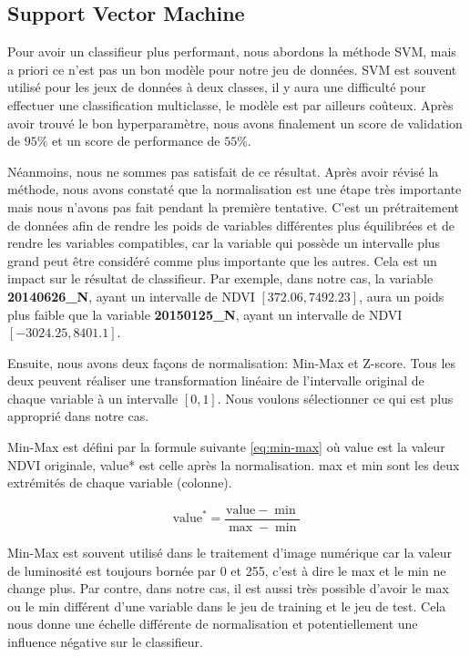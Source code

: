 \documentclass[twocolumn,10pt]{article}
\begin{document}
\subsection{Support Vector Machine} 

Pour avoir un classifieur plus performant, nous abordons la méthode SVM, mais a priori ce n'est pas un bon modèle pour notre jeu de données. SVM est souvent utilisé pour les jeux de données à deux classes, il y aura une difficulté pour effectuer une classification multiclasse, le modèle est par ailleurs coûteux. Après avoir trouvé le bon hyperparamètre, nous avons finalement un score de validation de $ 95\% $ et un score de performance de $ 55\% $.

Néanmoins, nous ne sommes pas satisfait de ce résultat. Après avoir révisé la méthode, nous avons constaté que la normalisation est une étape très importante mais nous n'avons pas fait pendant la première tentative. C'est un prétraitement de données afin de rendre les poids de variables différentes plus équilibrées et de rendre les variables compatibles, car la variable qui possède un intervalle plus grand peut être considéré comme plus importante que les autres. Cela est un impact sur le résultat de classifieur. Par exemple, dans notre cas, la variable \textbf{20140626\_N}, ayant un intervalle de NDVI  \(\left[372.06,7492.23\right]\), aura un poids plus faible que la variable \textbf{20150125\_N}, ayant un intervalle de NDVI \(\left[-3024.25, 8401.1\right]\).

Ensuite, nous avons deux façons de normalisation: Min-Max et Z-score. Tous les deux peuvent réaliser une transformation linéaire de l'intervalle original de chaque variable à un intervalle \(\left[0,1\right]\). Nous voulons sélectionner ce qui est plus approprié dans notre cas.

Min-Max est défini par la formule suivante \ref{eq:min-max} où value est la valeur NDVI originale, value* est celle après la normalisation. max et min sont les deux extrémités de chaque variable (colonne).

\begin{equation}
\label{eq:min-max}
\text{value}^* = \frac{\text{value} - \min}{\max - \min}
\end{equation}

Min-Max est souvent utilisé dans le traitement d'image numérique car la valeur de luminosité est toujours bornée par 0 et 255, c'est à dire le max et le min ne change plus. Par contre, dans notre cas, il est aussi très possible d'avoir le max ou le min différent d'une variable dans le jeu de training et le jeu de test. Cela nous donne une échelle différente de normalisation et potentiellement une influence négative sur le classifieur.
\end{document}
